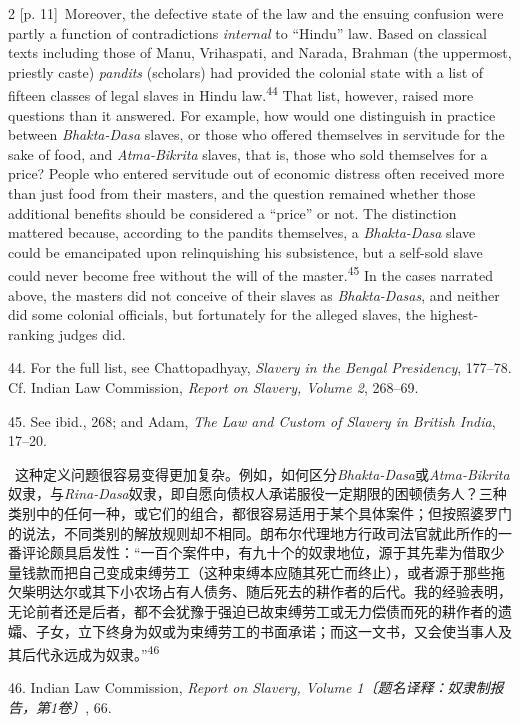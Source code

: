 \documentclass[10pt,a4paper]{article}
\begin{document}
\begin{paracol}{2}
\switchcolumn
{\scriptsize\color{gray} [p. 11]}\ Moreover, the defective state of the law and the ensuing confusion were partly a function of contradictions \textit{internal} to “Hindu” law. Based on classical texts including those of Manu, Vrihaspati, and Narada, Brahman (the uppermost, priestly caste) \textit{pandits} (scholars) had provided the colonial state with a list of fifteen classes of legal slaves in Hindu law.\nobreak\textsuperscript{44} That list, however, raised more questions than it answered. For example, how would one distinguish in practice between \textit{Bhakta-Dasa} slaves, or those who offered themselves in servitude for the sake of food, and \textit{Atma-Bikrita} slaves, that is, those who sold themselves for a price? People who entered servitude out of economic distress often received more than just food from their masters, and the question remained whether those additional benefits should be considered a “price” or not. The distinction mattered because, according to the pandits themselves, a \textit{Bhakta-Dasa} slave could be emancipated upon relinquishing his subsistence, but a self-sold slave could never become free without the will of the master.\nobreak\textsuperscript{45} In the cases narrated above, the masters did not conceive of their slaves as \textit{Bhakta-Dasas}, and neither did some colonial officials, but fortunately for the alleged slaves, the highest-ranking judges did.\par{\small 44. For the full list, see Chattopadhyay, \textit{Slavery in the Bengal Presidency}, 177–78. Cf. Indian Law Commission, \textit{Report on Slavery, Volume 2}, 268–69.\par}{\small 45. See ibid., 268; and Adam, \textit{The Law and Custom of Slavery in British India}, 17–20.\par}
\switchcolumn*
{\scriptsize\color{gray} [p. 11]}\ 这种定义问题很容易变得更加复杂。例如，如何区分\textit{Bhakta-Dasa}或\textit{Atma-Bikrita}奴隶，与\textit{Rina-Dasa}奴隶，即自愿向债权人承诺服役一定期限的困顿债务人？三种类别中的任何一种，或它们的组合，都很容易适用于某个具体案件；但按照婆罗门的说法，不同类别的解放规则却不相同。朗布尔代理地方行政司法官就此所作的一番评论颇具启发性：“一百个案件中，有九十个的奴隶地位，源于其先辈为借取少量钱款而把自己变成束缚劳工（这种束缚本应随其死亡而终止），或者源于那些拖欠柴明达尔或其下小农场占有人债务、随后死去的耕作者的后代。我的经验表明，无论前者还是后者，都不会犹豫于强迫已故束缚劳工或无力偿债而死的耕作者的遗孀、子女，立下终身为奴或为束缚劳工的书面承诺；而这一文书，又会使当事人及其后代永远成为奴隶。”\nobreak\textsuperscript{46}\par{\small 46. Indian Law Commission, \textit{Report on Slavery, Volume 1〔题名译释：奴隶制报告，第1卷〕}, 66.\par}

\end{paracol}
\end{document}
